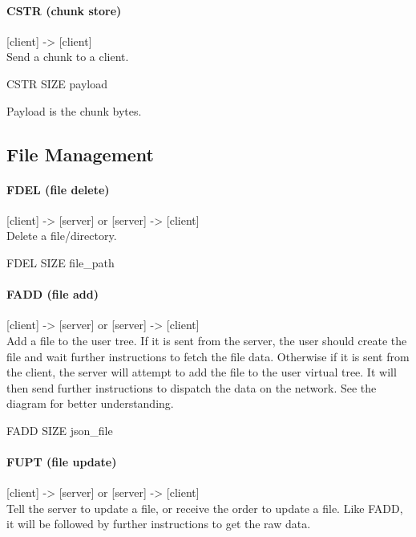 \documentclass{article}
\begin{document}
\paragraph{CSTR (chunk store)}
[client] -> [client]\\
Send a chunk to a client.

\begin{center}CSTR SIZE payload\end{center}

Payload is the chunk bytes.

\subsection{File Management}

\paragraph{FDEL (file delete)}

[client] -> [server] or [server] -> [client] \\
Delete a file/directory.\\

\begin{center}FDEL SIZE file\_path\end{center}

\paragraph{FADD (file add)}

[client] -> [server] or [server] -> [client] \\

Add a file to the user tree. If it is sent from the server, the user should create the file and wait further instructions to fetch the file data. Otherwise if it is sent from the client, the server will attempt to add the file to the user virtual tree. It will then send further instructions to dispatch the data on the network. See the diagram for better understanding.\\

\begin{center}FADD SIZE json\_file\end{center}

\paragraph{FUPT (file update)}

[client] -> [server] or [server] -> [client] \\
Tell the server to update a file, or receive the order to update a file. Like FADD, it will be followed by further instructions to get the raw data.
\end{document}
